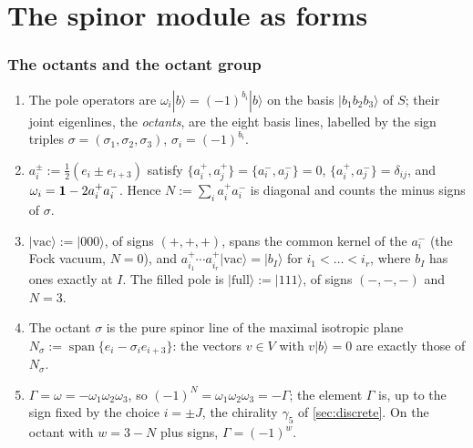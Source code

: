 \section{The spinor module as forms}
\label{sec:w:thespinormoduleasforms}

\subsubsection{The octants and the octant group}
\label{r3:sec:octants}

\begin{proposition}
\label{r3:prop:octants}
\begin{enumerate}[label=(\roman*),leftmargin=2.2em]
\item The pole operators are $\omega_i|b\rangle=(-1)^{b_i}|b\rangle$ on the basis $|b_1b_2b_3\rangle$ of $S$; their joint eigenlines, the
\emph{octants}, are the eight basis lines, labelled by the sign triples $\sigma=(\sigma_1,\sigma_2,\sigma_3)$, $\sigma_i=(-1)^{b_i}$.
\item $a^\pm_i:=\tfrac12(e_i\pm e_{i+3})$ satisfy $\{a^+_i,a^+_j\}=\{a^-_i,a^-_j\}=0$, $\{a^+_i,a^-_j\}=\delta_{ij}$, and
$\omega_i=\mathbf 1-2a^+_ia^-_i$. Hence $N:=\sum_ia^+_ia^-_i$ is diagonal and counts the minus signs of $\sigma$.
\item $|\mathrm{vac}\rangle:=|000\rangle$, of signs $(+,+,+)$, spans the common kernel of the $a^-_i$ (the Fock vacuum, $N=0$), and
$a^+_{i_1}\cdots a^+_{i_r}|\mathrm{vac}\rangle=|b_I\rangle$ for $i_1<\dots<i_r$, where $b_I$ has ones exactly at $I$. The filled pole is
$|\mathrm{full}\rangle:=|111\rangle$, of signs $(-,-,-)$ and $N=3$.
\item The octant $\sigma$ is the pure spinor line of the maximal isotropic plane $N_\sigma:=\operatorname{span}\{e_i-\sigma_ie_{i+3}\}$: the
vectors $v\in V$ with $v|b\rangle=0$ are exactly those of $N_\sigma$.
\item $\Gamma=\omega=-\omega_1\omega_2\omega_3$, so $(-1)^N=\omega_1\omega_2\omega_3=-\Gamma$; the element $\Gamma$ is, up to the sign fixed by the choice $i=\pm J$, the chirality $\gamma_5$ of \cref{sec:discrete}. On the octant with $w=3-N$ plus signs, $\Gamma=(-1)^w$.
\end{enumerate}
\end{proposition}

